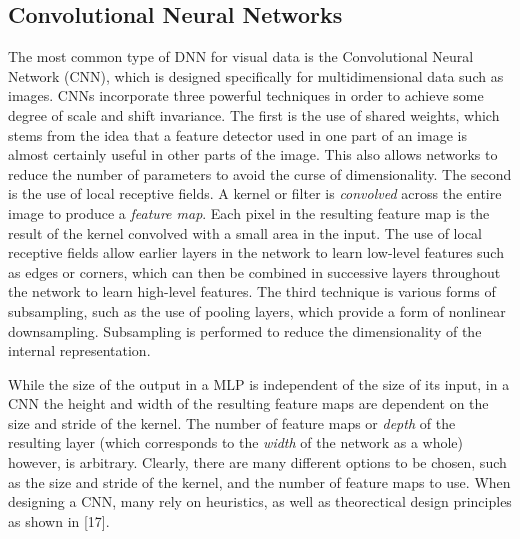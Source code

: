 \documentclass[9pt]{article}
\begin{document}
\subsection{Convolutional Neural Networks}
\noindent The most common type of DNN for visual data is the Convolutional Neural Network (CNN), which is designed specifically for
multidimensional data such as images. CNNs incorporate three powerful techniques in order to achieve some degree of scale and shift invariance.
The first is the use of shared weights, which stems from the idea that a feature detector used in one part of an image is almost certainly useful in
other parts of the image. This also allows networks to reduce the number of parameters to avoid the curse of dimensionality. The second is the use of
local receptive fields. A kernel or filter is \textit{convolved} across the entire
image to produce a \textit{feature map}. Each pixel in the resulting feature map is the result of the kernel convolved with a small area in the input.
The use of local receptive fields allow earlier layers in the network to learn low-level features such as edges or corners, which can then be combined
in successive layers throughout the network to learn high-level features. The third technique is various forms of subsampling, such as the use of pooling
layers, which provide a form of nonlinear downsampling. Subsampling is performed to reduce the dimensionality of the internal representation. \newline

\noindent While the size of the output in a MLP is independent of the size of its input, in a CNN
the height and width of the resulting feature maps are dependent on the size and stride of the kernel. The number of feature maps or \textit{depth} of the
resulting layer (which corresponds to the \textit{width} of the network as a whole) however, is arbitrary. Clearly, there are many different options to be chosen,
such as the size and stride of the kernel, and the number of feature maps to use. When designing a CNN, many rely on heuristics, as well as theorectical
design principles as shown in [17]. \newline%

\end{document}
